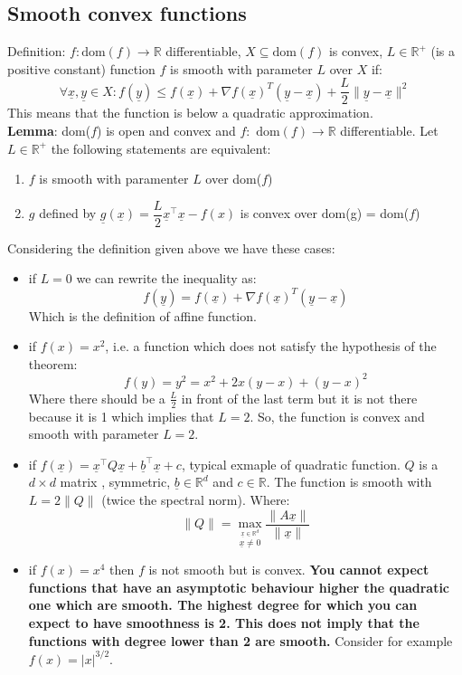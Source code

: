 \subsection{Smooth convex functions}
Definition: $f: \text{dom}(f) \to \mathbb{R}$ differentiable, $X \subseteq \text{dom}(f)$ is convex, $L \in \mathbb{R}^+$ (is a positive constant) function $f$ is smooth with parameter $L$ over $X$ if:
\[
    \forall \underline{x}, \underline{y} \in X: f(\underline{y}) \leq f(\underline{x}) + \nabla f(\underline{x})^T(\underline{y}-\underline{x}) + \dfrac{L}{2}\|\underline{y}-\underline{x}\|^2    
\]
This means that the function is below a quadratic approximation. \\

\textbf{Lemma}: dom($f$) is open and convex and $f: \text{ dom}(f) \to \mathbb{R}$ differentiable. Let $L \in \mathbb{R}^+$ the following statements are equivalent:
\begin{enumerate}
    \item $f$ is smooth with paramenter $L$ over dom($f$)
    \item $g$ defined by $\underline{g}(\underline{x}) = \dfrac{L}{2}\underline{x}^\intercal \underline{x} - f(x)$ is convex over $\text{dom}$(\underline{g}) = dom($f$) 
\end{enumerate}
Considering the definition given above we have these cases:
\begin{itemize}
    \item if $L=0$ we can rewrite the inequality as:
    \[
        f(\underline{y}) = f(\underline{x}) + \nabla f(\underline{x})^T(\underline{y}-\underline{x})      
    \]
    Which is the definition of affine function.
    \item if $f(x) = x^2$, i.e. a function which does not satisfy the hypothesis of the theorem:
    \[
        f(y) = y^2 = x^2 + 2x(y - x)+(y- x)^2    
    \]
    Where there should be a $\frac{L}{2}$ in front of the last term but it is not there because it is 1 which implies that $L=2$. So, the function is convex and smooth with parameter $L=2$.
    \item if $f(\underline{x}) = \underline{x}^\intercal Q \underline{x} + \underline{b}^\intercal \underline{x} + c$, typical exmaple of quadratic function. $Q$ is a $d \times d$ matrix , symmetric, $\underline{b} \in \mathbb{R}^d$ and $c \in \mathbb{R}$. The function is smooth with $L = 2\|Q\|$ (twice the spectral norm). Where:
    \[
        \|Q\| = \max_{\overset{\underline{x} \in \mathbb{R}^d}{\underline{x}\neq 0}} \dfrac{\|A\underline{x}\|}{\|\underline{x}\|}   
    \]
    \item if $f(x) = x^4$ then $f$ is not smooth but is convex. \textbf{You cannot expect functions that have an asymptotic behaviour higher the quadratic one which are smooth. The highest degree for which you can expect to have smoothness is 2. This does not imply that the functions with degree lower than 2 are smooth.} Consider for example $f(x)= |x|^{3/2}$.
\end{itemize}

